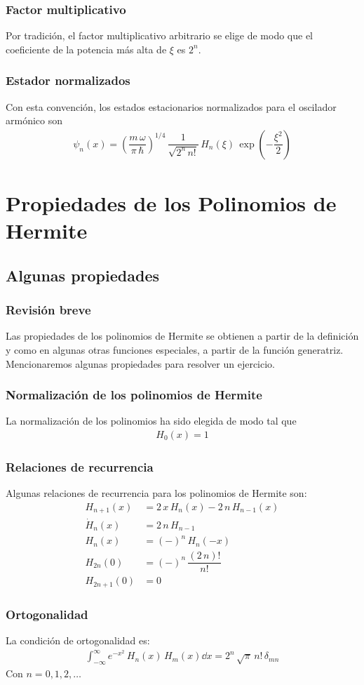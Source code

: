 \documentclass[12pt]{beamer}
\begin{document}
\begin{frame}
\frametitle{Factor multiplicativo}
Por tradición, el factor multiplicativo arbitrario se elige de modo que el coeficiente de la potencia más alta de $\xi$ es $2^{n}$.
\end{frame}
\begin{frame}
\frametitle{Estador normalizados}
Con esta convención, los estados estacionarios normalizados para el oscilador armónico son
\begin{align}
\psi_{n} (x) = \left( \dfrac{m \, \omega}{\pi \, \hbar} \right)^{1/4} \, \dfrac{1}{\sqrt{2^{n} \, n!}} \, H_{n} (\xi) \, \exp \left( - \dfrac{\xi^{2}}{2} \right)
\label{eq:ecuacion_02_069}
\end{align}
\end{frame}

\section{Propiedades de los Polinomios de Hermite}
\subsection{Algunas propiedades}

\begin{frame}
\frametitle{Revisión breve}
Las propiedades de los polinomios de Hermite se obtienen a partir de la definición y como en algunas otras funciones especiales, a partir de la función generatriz.
\\
\bigskip
\pause
Mencionaremos algunas propiedades para resolver un ejercicio.
\end{frame}
\begin{frame}
\frametitle{Normalización de los polinomios de Hermite}
La normalización de los polinomios ha sido elegida de modo tal que 
\begin{align*}
H_{0}(x) = 1
\end{align*}
\end{frame}
\begin{frame}
\frametitle{Relaciones de recurrencia}
Algunas relaciones de recurrencia para los polinomios de Hermite son:
\begin{align*}
H_{n+1} (x) &= 2 \, x \, H_{n} (x) - 2 \, n \, H_{n-1} (x) \\
\dot{H}_{n} (x) &= 2 \, n \, H_{n-1} \\
H_{n} (x) &= (-)^{n} \, H_{n} (-x) \\
H_{2n} (0) &= (-)^{n} \, \dfrac{(2 \, n)!}{n!} \\
H_{2n+1} (0) &= 0
\end{align*}
\end{frame}
\begin{frame}
\frametitle{Ortogonalidad}
La condición de ortogonalidad es:
\begin{align*}
\int_{-\infty}^{\infty} e^{-x^{2}} \, H_{n} (x) \, H_{m} (x) \dd{x} = 2^{n} \, \sqrt{\pi} \, n! \, \delta_{m n}
\end{align*}
Con $n = 0, 1, 2, \ldots$
\end{frame}
\end{document}
